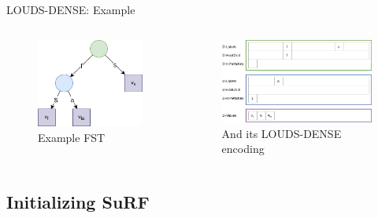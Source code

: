 \documentclass{beamer}
\begin{document}
\begin{frame}{LOUDS-DENSE: Example}
		\begin{columns}
				\begin{figure}
						\centering
						\includegraphics[width=\textwidth]{resources/louds_trie}
						\caption{Example FST}
				\end{figure}
				\begin{figure}
						\centering
						\includegraphics[width=\textwidth]{resources/louds_dense}
						\caption{And its LOUDS-DENSE encoding}
				\end{figure}
		\end{columns}
\end{frame}


\subsection{Initializing SuRF}
\end{document}

